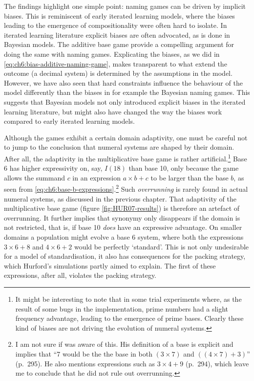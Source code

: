 \documentclass{../src/bcthesispart}
\begin{document}
The findings highlight one simple point: naming games can be driven by implicit biases.
This is reminiscent of early iterated learning models, where the biases leading to the emergence of compositionality were often hard to isolate.
In iterated learning literature \parencite{Kirby2007,Kirby2007} explicit biases are often advocated, as is done in Bayesian models.
The additive base game provide a compelling argument for doing the same with naming games.
Explicating the biases, as we did in \eqref{eq:ch6:bias-additive-naming-game}, makes transparent to what extend the outcome (a decimal system) is determined by the assumptions in the model.
However, we have also seen that hard constraints influence the behaviour of the model differently than the biases in for example the Bayesian naming games.
This suggests that Bayesian models not only introduced explicit biases in the iterated learning literature, but might also have changed the way the biases work compared to early iterated learning models.






Although the games exhibit a certain domain adaptivity, one must be careful not to jump to the conclusion that numeral systems are shaped by their domain.
After all, the adaptivity in the multiplicative base game is rather artificial.\footnote{%
	It might be interesting to note that in some trial experiments where, as the result of some bugs in the implementation, prime numbers had a slight frequency advantage, leading to the emergence of prime bases.
	Clearly these kind of biases are not driving the evolution of numeral systems.
	}
Base 6 has higher expressivity on, say, $I(18)$ than base 10, only because the game allows the summand $c$ in an expression $a \times b +c$ to be larger than the base $b$, as seen from \eqref{eq:ch6:base-b-expressions}.\footnote{%
	I am not sure if \textcite{Hurford1987} was aware of this. His definition of a base is explicit and implies that “7 would be the the base in both $(3 \times 7)$ and $((4 \times 7) + 3)$” (p.~295). He also mentions expressions such as $3\times 4 + 9$ (p.~294), which leave me to conclude that he did not rule out overrunning.
	}
Such \emph{overrunning} is rarely found in actual numeral systems, as discussed in the previous chapter.
That adaptivity of the multiplicative base game (figure \ref{fig:HUR07-results}) is therefore an artefact of overrunning.
It further implies that synonymy only disappears if the domain is not restricted, that is, if base 10 \emph{does} have an expressive advantage.
On smaller domains a population might evolve a base 6 system, where both the expressions $3\times 6 + 8$ and $4 \times 6 + 2$ would be perfectly ‘standard’.
This is not only undesirable for a model of standardisation, it also has consequences for the packing strategy, which Hurford’s simulations partly aimed to explain.
The first of these expressions, after all, violates the packing strategy.
\end{document}
